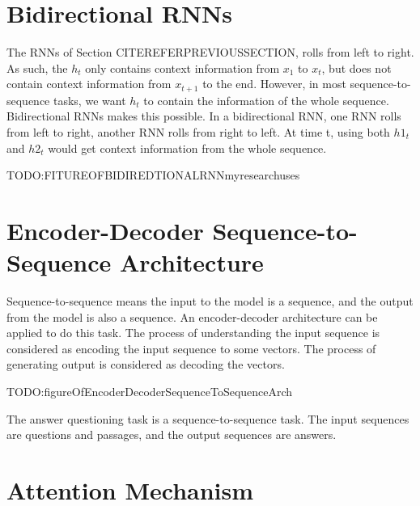 \documentclass[modernstyle,12pt]{sjsuthesis}
\theoremstyle{definition}
\begin{document}
\section{Bidirectional RNNs}

The RNNs of Section CITEREFERPREVIOUSSECTION, rolls from left to right. As such, the $h_t$ only contains context information from $x_1$ to $x_t$, but does not contain context information from $x_{t+1}$ to the end. However, in most sequence-to-sequence tasks, we want $h_t$ to contain the information of the whole sequence. Bidirectional RNNs makes this possible. In a bidirectional RNN, one RNN rolls from left to right, another RNN rolls from right to left. At time t, using both $h1_t$ and $h2_t$ would get context information from the whole sequence.

TODO:FITUREOFBIDIREDTIONALRNNmyresearchuses

\section{Encoder-Decoder Sequence-to-Sequence Architecture}

Sequence-to-sequence means the input to the model is a sequence, and the output from the model is also a sequence. An encoder-decoder architecture can be applied to do this task. The process of understanding the input sequence is considered as encoding the input sequence to some vectors. The process of generating output is considered as decoding the vectors.

TODO:figureOfEncoderDecoderSequenceToSequenceArch

The answer questioning task is a sequence-to-sequence task. The input sequences are questions and passages, and the output sequences are answers.

\section{Attention Mechanism}
\end{document}
